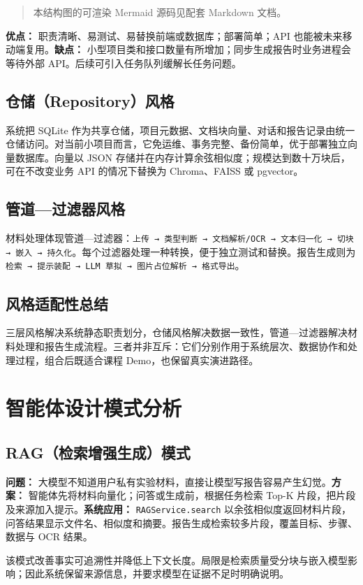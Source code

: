 \documentclass[12pt,a4paper]{ctexart}
\begin{document}
\begin{quote}\small 本结构图的可渲染 Mermaid 源码见配套 Markdown 文档。\end{quote}
\textbf{优点：} 职责清晰、易测试、易替换前端或数据库；部署简单；API 也能被未来移动端复用。\textbf{缺点：} 小型项目类和接口数量有所增加；同步生成报告时业务进程会等待外部 API。后续可引入任务队列缓解长任务问题。

\subsection{仓储（Repository）风格}
系统把 SQLite 作为共享仓储，项目元数据、文档块向量、对话和报告记录由统一仓储访问。对当前小项目而言，它免运维、事务完整、备份简单，优于部署独立向量数据库。向量以 JSON 存储并在内存计算余弦相似度；规模达到数十万块后，可在不改变业务 API 的情况下替换为 Chroma、FAISS 或 pgvector。

\subsection{管道—过滤器风格}
材料处理体现管道—过滤器：\texttt{上传 → 类型判断 → 文档解析/OCR → 文本归一化 → 切块 → 嵌入 → 持久化}。每个过滤器处理一种转换，便于独立测试和替换。报告生成则为 \texttt{检索 → 提示装配 → LLM 草拟 → 图片占位解析 → 格式导出}。

\subsection{风格适配性总结}
三层风格解决系统静态职责划分，仓储风格解决数据一致性，管道—过滤器解决材料处理和报告生成流程。三者并非互斥：它们分别作用于系统层次、数据协作和处理过程，组合后既适合课程 Demo，也保留真实演进路径。

\section{智能体设计模式分析}
\subsection{RAG（检索增强生成）模式}
\textbf{问题：} 大模型不知道用户私有实验材料，直接让模型写报告容易产生幻觉。\textbf{方案：} 智能体先将材料向量化；问答或生成前，根据任务检索 Top-K 片段，把片段及来源加入提示。\textbf{系统应用：} \texttt{RAGService.search} 以余弦相似度返回材料片段，问答结果显示文件名、相似度和摘要。报告生成检索较多片段，覆盖目标、步骤、数据与 OCR 结果。

该模式改善事实可追溯性并降低上下文长度。局限是检索质量受分块与嵌入模型影响；因此系统保留来源信息，并要求模型在证据不足时明确说明。
\end{document}

